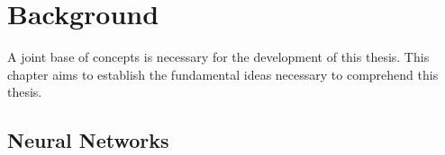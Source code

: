 \chapter{Background}
\label{ch:background}

A joint base of concepts is necessary for the development of this thesis. This chapter aims to establish the fundamental ideas necessary to comprehend this thesis.

\section{Neural Networks}

